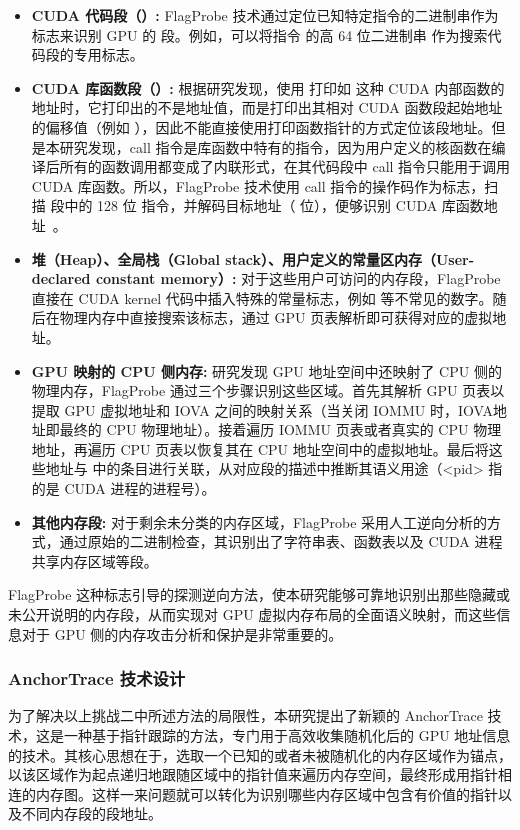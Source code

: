 \begin{itemize}
\item \textbf{CUDA 代码段（）:}
FlagProbe 技术通过定位已知特定指令的二进制串作为标志来识别 GPU 的  段。例如，可以将指令  的高 64 位二进制串  作为搜索代码段的专用标志。

\item \textbf{CUDA 库函数段（）:}  
根据研究发现，使用 打印如  这种 CUDA 内部函数的地址时，它打印出的不是地址值，而是打印出其相对 CUDA 函数段起始地址的偏移值（例如 ），因此不能直接使用打印函数指针的方式定位该段地址。但是本研究发现，call 指令是库函数中特有的指令，因为用户定义的核函数在编译后所有的函数调用都变成了内联形式，在其代码段中 call 指令只能用于调用 CUDA 库函数。所以，FlagProbe 技术使用 call 指令的操作码作为标志，扫描  段中的 128 位  指令，并解码目标地址（  位），便够识别 CUDA 库函数地址~\cite{nv_isa_solver}。

\item \textbf{堆（Heap）、全局栈（Global stack）、用户定义的常量区内存（User-declared constant memory）:}  
对于这些用户可访问的内存段，FlagProbe 直接在 CUDA kernel 代码中插入特殊的常量标志，例如  等不常见的数字。随后在物理内存中直接搜索该标志，通过 GPU 页表解析即可获得对应的虚拟地址。

\item \textbf{GPU 映射的 CPU 侧内存:} 
研究发现 GPU 地址空间中还映射了 CPU 侧的物理内存，FlagProbe 通过三个步骤识别这些区域。首先其解析 GPU 页表以提取 GPU 虚拟地址和 IOVA 之间的映射关系（当关闭 IOMMU 时，IOVA地址即最终的 CPU 物理地址）。接着遍历 IOMMU 页表或者真实的 CPU 物理地址，再遍历 CPU 页表以恢复其在 CPU 地址空间中的虚拟地址。最后将这些地址与  中的条目进行关联，从对应段的描述中推断其语义用途（<pid> 指的是 CUDA 进程的进程号）。

\item \textbf{其他内存段:}  
对于剩余未分类的内存区域，FlagProbe 采用人工逆向分析的方式，通过原始的二进制检查，其识别出了字符串表、函数表以及 CUDA 进程共享内存区域等段。
\end{itemize}

FlagProbe 这种标志引导的探测逆向方法，使本研究能够可靠地识别出那些隐藏或未公开说明的内存段，从而实现对 GPU 虚拟内存布局的全面语义映射，而这些信息对于 GPU 侧的内存攻击分析和保护是非常重要的。

\subsubsection{AnchorTrace 技术设计}
为了解决以上挑战二中所述方法的局限性，本研究提出了新颖的 AnchorTrace 技术，这是一种基于指针跟踪的方法，专门用于高效收集随机化后的 GPU 地址信息的技术。其核心思想在于，选取一个已知的或者未被随机化的内存区域作为锚点，以该区域作为起点递归地跟随区域中的指针值来遍历内存空间，最终形成用指针相连的内存图。这样一来问题就可以转化为识别哪些内存区域中包含有价值的指针以及不同内存段的段地址。

